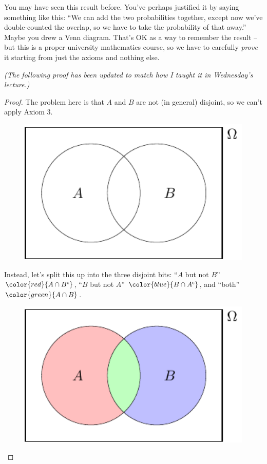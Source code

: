 \documentclass[
  letterpaper,
  DIV=11,
  numbers=noendperiod]{scrreprt}
\theoremstyle{remark}
\begin{document}
You may have seen this result before. You've perhaps justified it by
saying something like this: ``We can add the two probabilities together,
except now we've double-counted the overlap, so we have to take the
probability of that away.'' Maybe you drew a Venn diagram. That's OK as
a way to remember the result -- but this is a proper university
mathematics course, so we have to carefully \emph{prove} it starting
from just the axioms and nothing else.

\emph{(The following proof has been updated to match how I taught it in
Wednesday's lecture.)}

\begin{proof}

The problem here is that \(A\) and \(B\) are not (in general) disjoint,
so we can't apply Axiom 3.

\begin{figure}

{\centering \includegraphics[width=4.44444in,height=\textheight]{sections/L04-probability_files/figure-pdf/add3-1.pdf}

}

\end{figure}

Instead, let's split this up into the three disjoint bits: {``\(A\) but
not \(B\)''} \(\color{red}{A \cap B^\mathsf{c}}\), {``\(B\) but not
\(A\)''} \(\color{blue}{B \cap A^\mathsf{c}}\), and {``both''}
\(\color{green}{A \cap B}\).

\begin{figure}

{\centering \includegraphics[width=4.44444in,height=\textheight]{sections/L04-probability_files/figure-pdf/add4-1.pdf}

}
\end{figure}
\end{proof}
\end{document}
